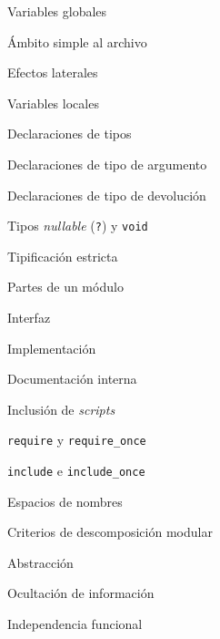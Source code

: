 \begin{longenum}
\begin{longenum}
\begin{longenum}
            \begin{longenum}
                \item Variables globales
                \begin{longenum}
                    \item Ámbito simple al archivo
                    \item Efectos laterales
                \end{longenum}
                \item Variables locales
            \end{longenum}
            \item Declaraciones de tipos
            \begin{longenum}
                \item Declaraciones de tipo de argumento
                \item Declaraciones de tipo de devolución
                \item Tipos \textit{nullable} (\texttt{?}) y \texttt{void}
                \item Tipificación estricta
            \end{longenum}
        \end{longenum}
        \item Partes de un módulo
        \begin{longenum}
            \item Interfaz
            \item Implementación
            \item Documentación interna
        \end{longenum}
        \item Inclusión de \textit{scripts}
        \begin{longenum}
            \item \texttt{require} y \texttt{require\_once}
            \item \texttt{include} e \texttt{include\_once}
        \end{longenum}
        \item Espacios de nombres
        \item Criterios de descomposición modular
        \begin{longenum}
            \item Abstracción
            \item Ocultación de información
            \item Independencia funcional
            \begin{longenum}

\end{longenum}
\end{longenum}
\end{longenum}
\end{longenum}
